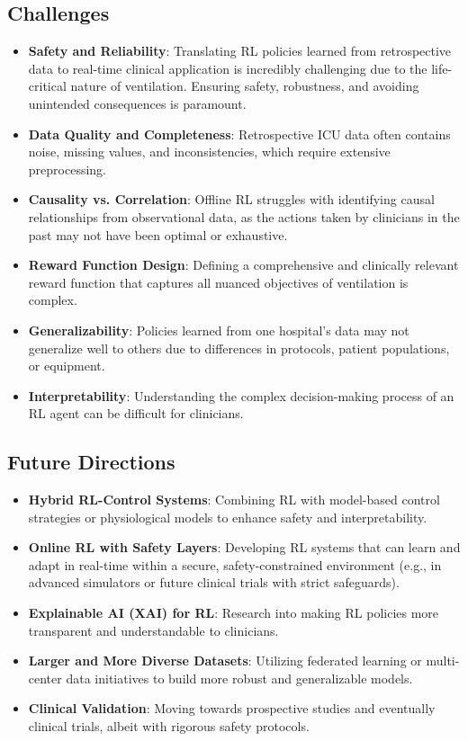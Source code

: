 \subsection*{Challenges}
\begin{itemize}
    \item \textbf{Safety and Reliability}: Translating RL policies learned from retrospective data to real-time clinical application is incredibly challenging due to the life-critical nature of ventilation. Ensuring safety, robustness, and avoiding unintended consequences is paramount.
    \item \textbf{Data Quality and Completeness}: Retrospective ICU data often contains noise, missing values, and inconsistencies, which require extensive preprocessing.
    \item \textbf{Causality vs. Correlation}: Offline RL struggles with identifying causal relationships from observational data, as the actions taken by clinicians in the past may not have been optimal or exhaustive.
    \item \textbf{Reward Function Design}: Defining a comprehensive and clinically relevant reward function that captures all nuanced objectives of ventilation is complex.
    \item \textbf{Generalizability}: Policies learned from one hospital's data may not generalize well to others due to differences in protocols, patient populations, or equipment.
\item \textbf{Interpretability}: Understanding the complex decision-making process of an RL agent can be difficult for clinicians.
\end{itemize}

\subsection*{Future Directions}
\begin{itemize}
    \item \textbf{Hybrid RL-Control Systems}: Combining RL with model-based control strategies or physiological models to enhance safety and interpretability.
    \item \textbf{Online RL with Safety Layers}: Developing RL systems that can learn and adapt in real-time within a secure, safety-constrained environment (e.g., in advanced simulators or future clinical trials with strict safeguards).
    \item \textbf{Explainable AI (XAI) for RL}: Research into making RL policies more transparent and understandable to clinicians.
    \item \textbf{Larger and More Diverse Datasets}: Utilizing federated learning or multi-center data initiatives to build more robust and generalizable models.
    \item \textbf{Clinical Validation}: Moving towards prospective studies and eventually clinical trials, albeit with rigorous safety protocols.
\end{itemize}

